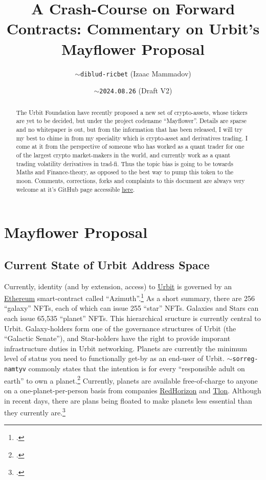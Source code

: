 \documentclass{article}
\begin{document}
	\title{A Crash-Course on Forward Contracts: Commentary on Urbit's Mayflower Proposal}
	\author{\texttt{$\sim$diblud-ricbet} (Izaac Mammadov)}
	\date{\texttt{$\sim$2024.08.26} (Draft V2)}
	\maketitle
	
	\begin{abstract}
		The Urbit Foundation have recently proposed a new set of crypto-assets, whose tickers are yet to be decided, but under the project codename ``Mayflower''. Details are sparse and no whitepaper is out, but from the information that has been released, I will try my best to chime in from my speciality which is crypto-asset and derivatives trading. I come at it from the perspective of someone who has worked as a quant trader for one of the largest crypto market-makers in the world, and currently work as a quant trading volatility derivatives in trad-fi. Thus the topic bias is going to be towards Maths and Finance-theory, as opposed to the best way to pump this token to the moon. Comments, corrections, forks and complaints to this document are always very welcome at it's GitHub page accessible \href{https://github.com/IzaacMammadov/forwards-for-urbiters}{here}.
	\end{abstract}
	
	\tableofcontents
	
	\section{Mayflower Proposal}
	\subsection{Current State of Urbit Address Space}
	Currently, identity (and by extension, access) to \href{https://urbit.org/}{Urbit} is governed by an \href{https://ethereum.org/en/}{Ethereum} smart-contract called ``Azimuth''.\footcite{azimuth} As a short summary, there are 256 ``galaxy'' NFTs, each of which can issue 255 ``star'' NFTs. Galaxies and Stars can each issue 65,535 ``planet'' NFTs. This hierarchical sructure is currently central to Urbit. Galaxy-holders form one of the governance structures of Urbit (the ``Galactic Senate''), and Star-holders have the right to provide imporant infrastructure duties in Urbit networking. Planets are currently the minimum level of status  you need to functionally get-by as an end-user of Urbit. \texttt{$\sim$sorreg-namtyv} commonly states that the intention is for every ``responsible adult on earth'' to own a planet.\footcite{curtis-tweet} Currently, planets are available free-of-charge to anyone on a one-planet-per-person basis from companies \href{https://redhorizon.com/}{RedHorizon} and \href{https://tlon.io/}{Tlon}. Although in recent days, there are plans being floated to make planets less essential than they currently are.\footcite{groundwire}
	
\end{document}
